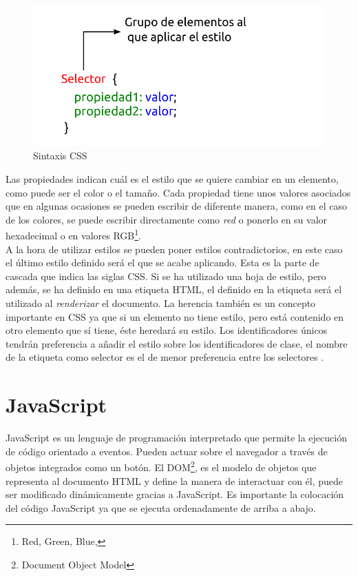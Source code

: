 \begin{figure}[H]
    \centering
    \includegraphics[width=12cm, keepaspectratio]{img/css.png}
    \caption{Sintaxis CSS}
    \label{fig:css}
\end{figure}
\newpage
Las propiedades indican cuál es el estilo que se quiere cambiar en un elemento, como puede ser el color o el tamaño. Cada propiedad tiene unos valores asociados que en algunas ocasiones se pueden escribir de diferente manera, como en el caso de los colores, se puede escribir directamente como \textit{red} o ponerlo en su valor hexadecimal o en valores RGB\footnote{ Red, Green, Blue,}.\\

A la hora de utilizar estilos se pueden poner estilos contradictorios, en este caso el último estilo definido será el que se acabe aplicando. Esta es la parte de cascada que indica las siglas CSS. Si se ha utilizado una hoja de estilo, pero además, se ha definido en una etiqueta HTML, el definido en la etiqueta será el utilizado al \textit{renderizar} el documento. La herencia también es un concepto importante en CSS ya que si un elemento no tiene estilo, pero está contenido en otro elemento que sí tiene, éste heredará su estilo. Los identificadores únicos tendrán preferencia a añadir el estilo sobre los identificadores de clase, el nombre de la etiqueta como selector es el de menor preferencia entre los selectores \cite{juan3}.


\section{JavaScript}
JavaScript es un lenguaje de programación interpretado que permite la ejecución de código orientado a eventos. Pueden actuar sobre el navegador a través de objetos integrados como un botón. El DOM\footnote{Document Object Model}, es el modelo de objetos que representa al documento HTML y define la manera de interactuar con él, puede ser modificado dinámicamente gracias a JavaScript. Es importante la colocación del código JavaScript ya que se ejecuta ordenadamente de arriba a abajo. \\

